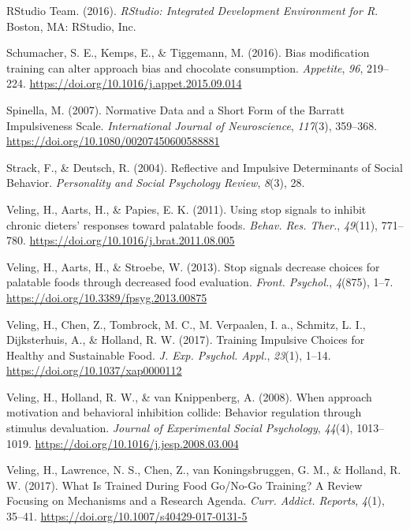 \documentclass[man,floatsintext]{apa6}
\begin{document}
\hypertarget{ref-rstudio}{}
RStudio Team. (2016). \emph{RStudio: Integrated Development Environment
for R}. Boston, MA: RStudio, Inc.

\hypertarget{ref-schumacher_bias_2016}{}
Schumacher, S. E., Kemps, E., \& Tiggemann, M. (2016). Bias modification
training can alter approach bias and chocolate consumption.
\emph{Appetite}, \emph{96}, 219--224.
\url{https://doi.org/10.1016/j.appet.2015.09.014}

\hypertarget{ref-spinellaNormativeDataShort2007}{}
Spinella, M. (2007). Normative Data and a Short Form of the Barratt
Impulsiveness Scale. \emph{International Journal of Neuroscience},
\emph{117}(3), 359--368. \url{https://doi.org/10.1080/00207450600588881}

\hypertarget{ref-strack_reflective_2004}{}
Strack, F., \& Deutsch, R. (2004). Reflective and Impulsive Determinants
of Social Behavior. \emph{Personality and Social Psychology Review},
\emph{8}(3), 28.

\hypertarget{ref-veling_using_2011}{}
Veling, H., Aarts, H., \& Papies, E. K. (2011). Using stop signals to
inhibit chronic dieters' responses toward palatable foods. \emph{Behav.
Res. Ther.}, \emph{49}(11), 771--780.
\url{https://doi.org/10.1016/j.brat.2011.08.005}

\hypertarget{ref-veling_stop_2013}{}
Veling, H., Aarts, H., \& Stroebe, W. (2013). Stop signals decrease
choices for palatable foods through decreased food evaluation.
\emph{Front. Psychol.}, \emph{4}(875), 1--7.
\url{https://doi.org/10.3389/fpsyg.2013.00875}

\hypertarget{ref-veling_training_2017-1}{}
Veling, H., Chen, Z., Tombrock, M. C., M. Verpaalen, I. a., Schmitz, L.
I., Dijksterhuis, A., \& Holland, R. W. (2017). Training Impulsive
Choices for Healthy and Sustainable Food. \emph{J. Exp. Psychol. Appl.},
\emph{23}(1), 1--14. \url{https://doi.org/10.1037/xap0000112}

\hypertarget{ref-veling_when_2008}{}
Veling, H., Holland, R. W., \& van Knippenberg, A. (2008). When approach
motivation and behavioral inhibition collide: Behavior regulation
through stimulus devaluation. \emph{Journal of Experimental Social
Psychology}, \emph{44}(4), 1013--1019.
\url{https://doi.org/10.1016/j.jesp.2008.03.004}

\hypertarget{ref-veling_what_2017}{}
Veling, H., Lawrence, N. S., Chen, Z., van Koningsbruggen, G. M., \&
Holland, R. W. (2017). What Is Trained During Food Go/No-Go Training? A
Review Focusing on Mechanisms and a Research Agenda. \emph{Curr. Addict.
Reports}, \emph{4}(1), 35--41.
\url{https://doi.org/10.1007/s40429-017-0131-5}
\end{document}
